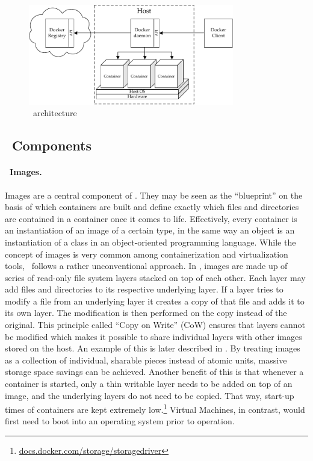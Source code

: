 \begin{figure}[htpb]
  \centering
  \includegraphics[width=0.8\textwidth]{figures/docker-arch.pdf}
  \caption[\docker\ architecture]{\docker\ architecture}\label{fig:docker-arch}
\end{figure}

\subsection{\docker\ Components}
\paragraph{\docker\ Images.}
Images are a central component of \docker . They may be seen as the ``blueprint'' on the basis of which containers are built and define exactly which files and directories are contained in a container once it comes to life. Effectively, every container is an instantiation of an image of a certain type, in the same way an object is an instantiation of a class in an object-oriented programming language. While the concept of images is very common among containerization and virtualization tools, \docker\ follows a rather unconventional approach.
In \docker , images are made up of series of read-only file system layers stacked on top of each other. Each layer may add files and directories to its respective underlying layer. If a layer tries to modify a file from an underlying layer it creates a copy of that file and adds it to its own layer. The modification is then performed on the copy instead of the original. This principle called ``Copy on Write'' (CoW) ensures that layers cannot be modified which makes it possible to share individual layers with other images stored on the host. An example of this is later described in . By treating images as a collection of individual, sharable pieces instead of atomic units, massive storage space savings can be achieved. Another benefit of this is that whenever a container is started, only a thin writable layer needs to be added on top of an image, and the underlying layers do not need to be copied. That way, start-up times of containers are kept extremely low.\footnote{\url{docs.docker.com/storage/storagedriver}}  Virtual Machines, in contrast, would first need to boot into an operating system prior to operation.

